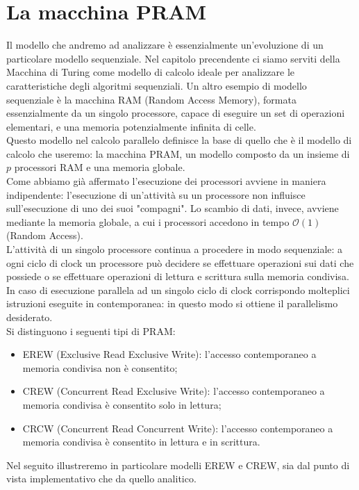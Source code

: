 \section{La macchina PRAM}
Il modello che andremo ad analizzare è essenzialmente un'evoluzione di un particolare modello sequenziale. Nel capitolo precendente ci siamo serviti della Macchina di Turing come modello di calcolo ideale per analizzare le caratteristiche degli algoritmi sequenziali. Un altro esempio di modello sequenziale è la macchina RAM (Random Access Memory), formata essenzialmente da un singolo processore, capace di eseguire un set di operazioni elementari, e una memoria potenzialmente infinita di celle.\\
Questo modello nel calcolo parallelo definisce la base di quello che è il modello di calcolo che useremo: la macchina PRAM, un modello composto da un insieme di $p$ processori RAM e una memoria globale.\\
Come abbiamo già affermato l'esecuzione dei processori avviene in maniera indipendente: l'esecuzione di un'attività su un processore non influisce sull'esecuzione di uno dei suoi "compagni". Lo scambio di dati, invece, avviene mediante la memoria globale, a cui i processori accedono in tempo $\mathcal {O}(1)$ (Random Access).\\
\newpage
\noindent L'attività di un singolo processore continua a procedere in modo sequenziale: a ogni ciclo di clock un processore può decidere se effettuare operazioni sui dati che possiede o se effettuare operazioni di lettura e scrittura sulla memoria condivisa. In caso di esecuzione parallela ad un singolo ciclo di clock corrispondo molteplici istruzioni eseguite in contemporanea: in questo modo si ottiene il parallelismo desiderato.\\
Si distinguono i seguenti tipi di PRAM:
\begin{itemize}
\item{EREW (Exclusive Read Exclusive Write): l'accesso contemporaneo a memoria condivisa non è consentito;}
\item{CREW (Concurrent Read Exclusive Write): l'accesso contemporaneo a memoria condivisa è consentito solo in lettura;}
\item{CRCW (Concurrent Read Concurrent Write): l'accesso contemporaneo a memoria condivisa è consentito in lettura e in scrittura.}
\end{itemize}
Nel seguito illustreremo in particolare modelli EREW e CREW, sia dal punto di vista implementativo che da quello analitico.\\
